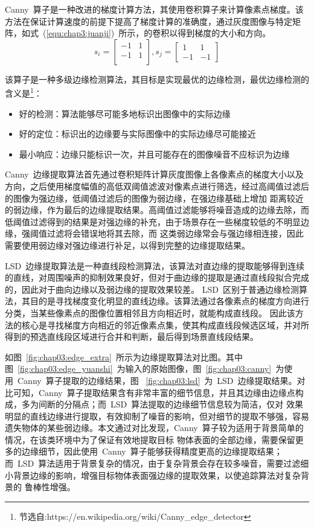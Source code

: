 Canny~算子是一种改进的梯度计算方法，其使用卷积算子来计算像素点梯度。该方法在保证计算速度的前提下提高了梯度计算的准确度，通过灰度图像与特定矩阵，如式~(\ref{equ:chap3:juanji})~所示，的卷积以得到梯度的大小和方向。
\begin{equation}
  \label{equ:chap3:juanji}
s_i=\left[\begin{matrix}
  -1 & 1\\
  -1 & 1\\
\end{matrix}\right],
s_j=\left[\begin{matrix}
  1 & 1\\ 
  -1 & -1
\end{matrix}\right]
\end{equation}

该算子是一种多级边缘检测算法，其目标是实现最优的边缘检测，最优边缘检测的含义是\footnote{节选自:https://en.wikipedia.org/wiki/Canny\_edge\_detector}：
\begin{itemize}
  \item 好的检测：算法能够尽可能多地标识出图像中的实际边缘
  \item 好的定位：标识出的边缘要与实际图像中的实际边缘尽可能接近
  \item 最小响应：边缘只能标识一次，并且可能存在的图像噪音不应标识为边缘
\end{itemize}

Canny~边缘提取算法首先通过卷积矩阵计算灰度图像上各像素点的梯度大小以及方向，之后使用梯度幅值的高低双阈值滤波对像素点进行筛选，经过高阈值过滤后的图像为强边缘，低阈值过滤后的图像为弱边缘，在强边缘基础上增加
距离较近的弱边缘，作为最后的边缘提取结果。高阈值过滤能够将噪音造成的边缘去除，而低阈值过滤得到的结果是对强边缘的补充，由于场景存在一些梯度较低的不明显边缘，强阈值过滤将会错误地将其去除，而
这类弱边缘常会与强边缘相连接，因此需要使用弱边缘对强边缘进行补足，以得到完整的边缘提取结果。

LSD~边缘提取算法是一种直线段检测算法，该算法对直边缘的提取能够得到连续的直线，对周围噪声的抑制效果良好，但对于曲边缘的提取是通过直线段拟合完成的，因此对于曲向边缘以及弱边缘的提取效果较差。
LSD~区别于普通边缘检测算法，其目的是寻找梯度变化明显的直线边缘。该算法通过各像素点的梯度方向进行分类，当某些像素点的图像位置相邻且方向相近时，就能构成直线段。
因此该方法的核心是寻找梯度方向相近的邻近像素点集，使其构成直线段候选区域，并对所得到的预选直线段区域进行合并和判断，最后得到场景直线段结果。

如图~\ref{fig:chap03:edge_extra}~所示为边缘提取算法对比图。其中图~\ref{fig:chap03:edge_yuanshi}~为输入的原始图像，图~\ref{fig:chap03:canny}~为使用~Canny~算子提取的边缘结果，图
~\ref{fig:chap03:lsd}~为~LSD~边缘提取结果。对比可知，Canny~算子提取结果含有非常丰富的细节信息，并且其边缘由边缘点构成，多为间断的分隔点；而~LSD~算法提取的边缘细节信息较为简洁，仅对
效果明显的直线边缘进行提取，有效抑制了噪音的影响，但对细节的提取不够强，容易遗失物体的某些弱边缘。本文通过对比发现，Canny~算子较为适用于背景简单的情况，在该类环境中为了保证有效地提取目标
物体表面的全部边缘，需要保留更多的边缘细节，因此使用~Canny~算子能够获得精度更高的边缘提取结果；而~LSD~算法适用于背景复杂的情况，由于复杂背景会存在较多噪音，需要过滤细小背景边缘的影响，增强目标物体表面强边缘的提取效果，以使追踪算法对复杂背景的
鲁棒性增强。

